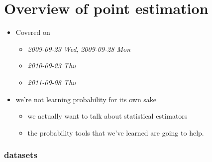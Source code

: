 
\part*{Overview of point estimation}%

\begin{itemize}
\item Covered on
\begin{itemize}
\item \textit{2009-09-23 Wed}, \textit{2009-09-28 Mon}
\item \textit{2010-09-23 Thu}
\item \textit{2011-09-08 Thu}
\end{itemize}
\item we're not learning probability for its own sake
\begin{itemize}
\item we actually want to talk about statistical estimators
\item the probability tools that we've learned are going to help.
\end{itemize}
\end{itemize}
\section{datasets}
\label{sec-1}

